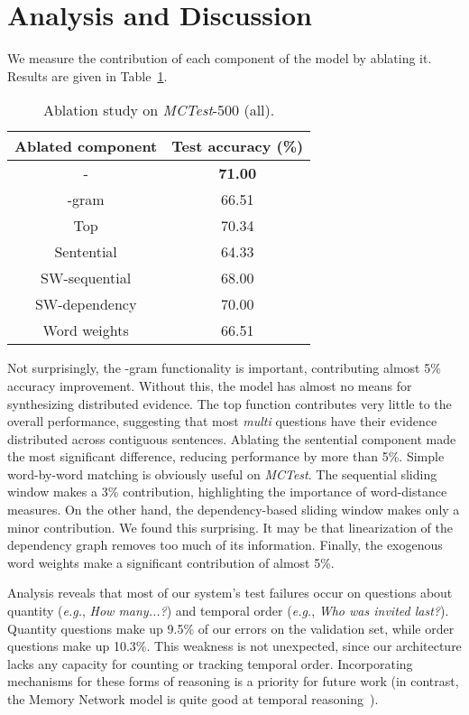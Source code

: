 \documentclass[11pt]{article}
\begin{document}
\section{Analysis and Discussion}
We measure the contribution of each component of the model by ablating it. Results are given in Table~\ref{tab:ablate}.
\begin{table}
	\small
	\centering
    \begin{tabular}{ | c | c |}
    	\hline
    	Ablated component & Test accuracy (\%) \\ \hline \hline
    	- & \textbf{71.00} \\ \hline
    	-gram & 66.51 \\ \hline
    	Top  & 70.34 \\ \hline
    	Sentential & 64.33 \\ \hline
    	SW-sequential & 68.00 \\ \hline
    	SW-dependency & 70.00 \\ \hline
    	Word weights & 66.51 \\ \hline
    \end{tabular}
    \caption{Ablation study on {\it MCTest}-500 (all).}
	\label{tab:ablate}
\end{table}
Not surprisingly, the -gram functionality is important, contributing almost 5\% accuracy improvement. Without this, the model has almost no means for synthesizing distributed evidence.
The top  function contributes very little to the overall performance, suggesting that most {\it multi} questions have their evidence distributed across contiguous sentences.
Ablating the sentential component made the most significant difference, reducing performance by more than 5\%. Simple word-by-word matching is obviously useful on {\it MCTest}.
The sequential sliding window makes a 3\% contribution, highlighting the importance of word-distance measures.
On the other hand, the dependency-based sliding window makes only a minor contribution. We found this surprising. It may be that linearization of the dependency graph removes too much of its information.
Finally, the exogenous word weights make a significant contribution of almost 5\%.

Analysis reveals that most of our system's test failures occur on questions about quantity ({\it e.g.}, \textsl{How many...?}) and temporal order ({\it e.g.}, \textsl{Who was invited last?}). Quantity questions make up 9.5\% of our errors on the validation set, while order questions make up 10.3\%. This weakness is not unexpected, since our architecture lacks any capacity for counting or tracking temporal order. Incorporating mechanisms for these forms of reasoning is a priority for future work (in contrast, the Memory Network model is quite good at temporal reasoning~\cite{weston2014}).
\end{document}
